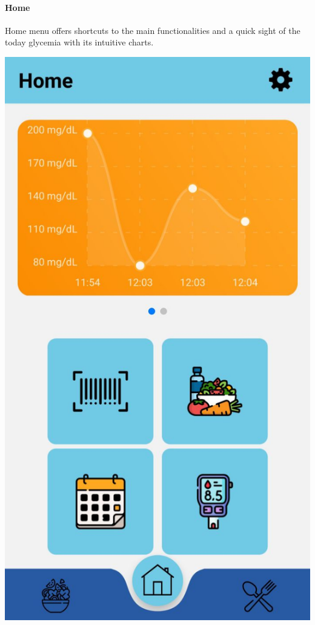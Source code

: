 \documentclass[12pt,hidelinks]{article}
\begin{document}
	\paragraph{Home}
    Home menu offers shortcuts to the main functionalities and a quick sight of the today glycemia with its intuitive charts.
	\begin{center}

	\includegraphics[scale=0.2]{screenshot3}
\end{center}
\end{document}
